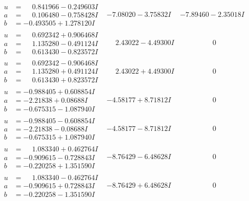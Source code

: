 \documentclass[1p]{elsarticle_modified}
\theoremstyle{definition}
\begin{document}
$$\begin{array}{c|c|c}
\begin{aligned}
u &= \phantom{-}0.841966 - 0.249603 I \\
a &= \phantom{-}0.106480 - 0.758428 I \\
b &= -0.493505 + 1.278120 I\end{aligned}
 & -7.08020 - 3.75832 I & -7.89460 - 2.35018 I \\ \hline\begin{aligned}
u &= \phantom{-}0.692342 + 0.906468 I \\
a &= \phantom{-}1.135280 - 0.491124 I \\
b &= \phantom{-}0.613430 - 0.823572 I\end{aligned}
 & \phantom{-}2.43022 - 4.49300 I & \phantom{-0.000000 } 0 \\ \hline\begin{aligned}
u &= \phantom{-}0.692342 - 0.906468 I \\
a &= \phantom{-}1.135280 + 0.491124 I \\
b &= \phantom{-}0.613430 + 0.823572 I\end{aligned}
 & \phantom{-}2.43022 + 4.49300 I & \phantom{-0.000000 } 0 \\ \hline\begin{aligned}
u &= -0.988405 + 0.608854 I \\
a &= -2.21838 + 0.08688 I \\
b &= -0.675315 - 1.087940 I\end{aligned}
 & -4.58177 + 8.71812 I & \phantom{-0.000000 } 0 \\ \hline\begin{aligned}
u &= -0.988405 - 0.608854 I \\
a &= -2.21838 - 0.08688 I \\
b &= -0.675315 + 1.087940 I\end{aligned}
 & -4.58177 - 8.71812 I & \phantom{-0.000000 } 0 \\ \hline\begin{aligned}
u &= \phantom{-}1.083340 + 0.462764 I \\
a &= -0.909615 - 0.728843 I \\
b &= -0.220258 + 1.351590 I\end{aligned}
 & -8.76429 - 6.48628 I & \phantom{-0.000000 } 0 \\ \hline\begin{aligned}
u &= \phantom{-}1.083340 - 0.462764 I \\
a &= -0.909615 + 0.728843 I \\
b &= -0.220258 - 1.351590 I\end{aligned}
 & -8.76429 + 6.48628 I & \phantom{-0.000000 } 0 \\ \hline\begin{aligned}

\end{aligned}
\end{array}$$
\end{document}
